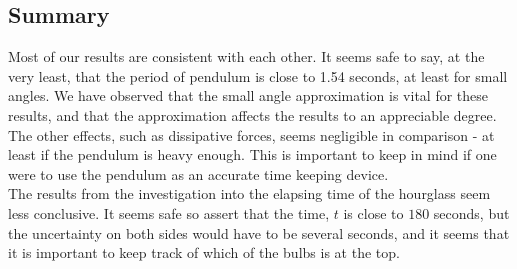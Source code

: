 \documentclass[a4paper, 10pt]{article}
\begin{document}
\subsection{Summary}
Most of our results are consistent with each other. It seems safe to say, at the very least, that the period of pendulum is close to 1.54 seconds, at least for small angles. We have observed that the small angle approximation is vital for these results, and that the approximation affects the results to an appreciable degree. The other effects, such as dissipative forces, seems negligible in comparison - at least if the pendulum is heavy enough. This is important to keep in mind if one were to use the pendulum as an accurate time keeping device.\\
\linebreak
The results from the investigation into the elapsing time of the hourglass seem less conclusive. It seems safe so assert that the time, $t$ is close to $180$ seconds, but the uncertainty on both sides would have to be several seconds, and it seems that it is important to keep track of which of the bulbs is at the top.
\end{document}
